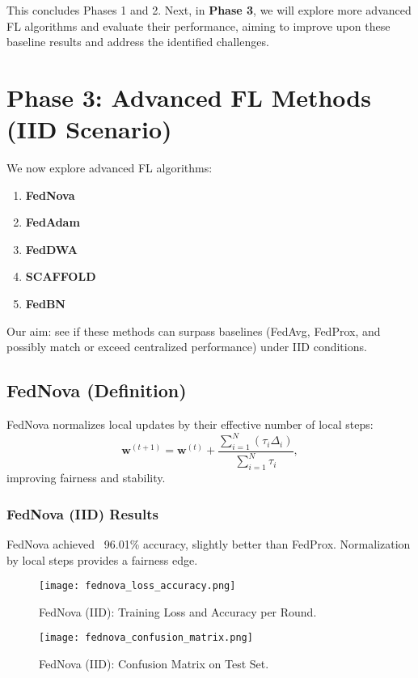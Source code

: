\documentclass[12pt,a4paper]{report}
\begin{document}
\bigskip

This concludes Phases 1 and 2. Next, in \textbf{Phase 3}, we will explore more advanced FL algorithms and evaluate their performance, aiming to improve upon these baseline results and address the identified challenges.

\chapter{Phase 3: Advanced FL Methods (IID Scenario)}

We now explore advanced FL algorithms:
\begin{enumerate}
	\item \textbf{FedNova}
	\item \textbf{FedAdam}
	\item \textbf{FedDWA}
	\item \textbf{SCAFFOLD}
	\item \textbf{FedBN}
\end{enumerate}

Our aim: see if these methods can surpass baselines (FedAvg, FedProx, and possibly match or exceed centralized performance) under IID conditions.

\section{FedNova (Definition)}

FedNova normalizes local updates by their effective number of local steps:
\[
\mathbf{w}^{(t+1)} = \mathbf{w}^{(t)} + \frac{\sum_{i=1}^{N} (\tau_i \Delta_i)}{\sum_{i=1}^{N}\tau_i},
\]
improving fairness and stability.

\subsection{FedNova (IID) Results}

FedNova achieved ~96.01\% accuracy, slightly better than FedProx. Normalization by local steps provides a fairness edge.

\begin{figure}[H]
	\centering
	\texttt{[image: fednova\_loss\_accuracy.png]}
	\caption{FedNova (IID): Training Loss and Accuracy per Round.}
\end{figure}

\begin{figure}[H]
	\centering
	\texttt{[image: fednova\_confusion\_matrix.png]}
	\caption{FedNova (IID): Confusion Matrix on Test Set.}
\end{figure}
\end{document}
